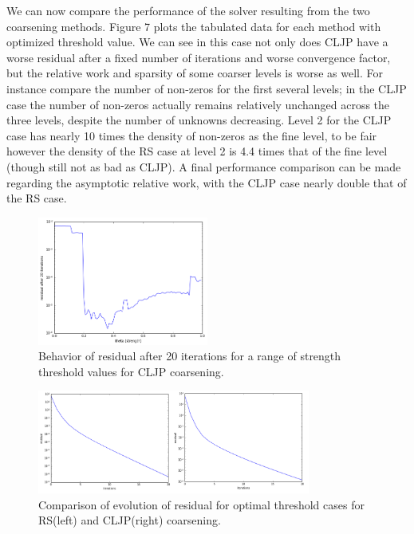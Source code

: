 \documentclass[letterpaper,10pt]{article}
\begin{document}
We can now compare the performance of the solver resulting from the two coarsening methods. Figure 7 plots the tabulated data for each method with optimized threshold value. We can see in this case not only does CLJP have a worse residual after a fixed number of iterations and worse convergence factor, but the relative work and sparsity of some coarser levels is worse as well. For instance compare the number of non-zeros for the first several levels; in the CLJP case the number of non-zeros actually remains relatively unchanged across the three levels, despite the number of unknowns decreasing. Level 2 for the CLJP case has nearly 10 times the density of non-zeros as the fine level, to be fair however the density of the RS case at level 2 is 4.4 times that of the fine level (though still not as bad as CLJP). A final performance comparison can be made regarding the asymptotic relative work, with the CLJP case nearly double that of the RS case.

\begin{figure}[!htb]
\centering
\includegraphics[width=0.5\textwidth]{CLJP.PNG}
\caption{Behavior of residual after 20 iterations for a range of strength threshold values for CLJP coarsening.}
\end{figure}

\begin{figure}[!htb]
\centering
\includegraphics[width=0.8\textwidth]{RS46CLJP36.PNG}
\caption{Comparison of evolution of residual for optimal threshold cases for RS(left) and CLJP(right) coarsening.}
\end{figure}
\end{document}
